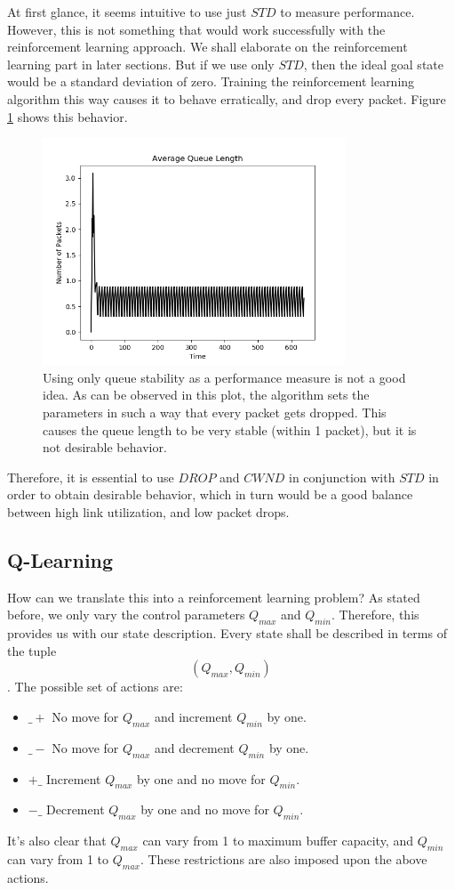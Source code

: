 \documentclass[conference, 10pt]{IEEEtran}
\begin{document}
At first glance, it seems intuitive to use just $STD$ to measure performance. However, this is not something that would work successfully with the reinforcement learning approach. We shall elaborate on the reinforcement learning part in later sections. But if we use only $STD$, then the ideal goal state would be a standard deviation of zero. Training the reinforcement learning algorithm this way causes it to behave erratically, and drop every packet. Figure \ref{fig:queuestab} shows this behavior.


\begin{figure}[ht!]
	\centering
	\includegraphics[width = 90mm]{QueueStab1.png}
	\caption{Using only queue stability as a performance measure is not a good idea. As can be observed in this plot, the algorithm sets the parameters in such a way that every packet gets dropped. This causes the queue length to be very stable (within 1 packet), but it is not desirable behavior.}
	\label{fig:queuestab}
\end{figure}

Therefore, it is essential to use $DROP$ and $CWND$ in conjunction with $STD$ in order to obtain desirable behavior, which in turn would be a good balance between high link utilization, and low packet drops. 

\subsection{Q-Learning}
\label{sec:prop:accreq}
How can we translate this into a reinforcement learning problem? As stated before, we only vary the control parameters $Q_{max}$ and $Q_{min}$. Therefore, this provides us with our state description. Every state shall be described in terms of the tuple $$(Q_{max}, Q_{min})$$. The possible set of actions are:
\begin{itemize}
    \item $\_+$ No move for $Q_{max}$ and increment $Q_{min}$ by one.
    \item $\_-$ No move for $Q_{max}$ and decrement $Q_{min}$ by one.
    \item $+\_$ Increment $Q_{max}$ by one and no move for $Q_{min}$.
    \item $-\_$ Decrement $Q_{max}$ by one and no move for $Q_{min}$.
\end{itemize}
It's also clear that $Q_{max}$ can vary from 1 to maximum buffer capacity, and $Q_{min}$ can vary from 1 to $Q_{max}$. These restrictions are also imposed upon the above actions.
\end{document}
